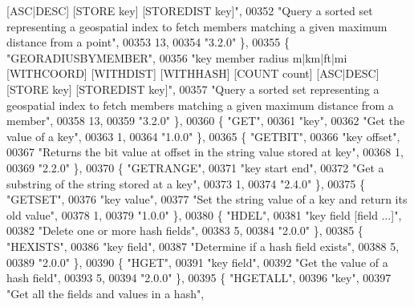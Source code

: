 \begin{DoxyCode}
{       [ASC|DESC] [STORE key] [STOREDIST key]"},
00352     \textcolor{stringliteral}{"Query a sorted set representing a geospatial index to fetch members matching a given maximum
       distance from a point"},
00353     13,
00354     \textcolor{stringliteral}{"3.2.0"} \},
00355     \{ \textcolor{stringliteral}{"GEORADIUSBYMEMBER"},
00356     \textcolor{stringliteral}{"key member radius m|km|ft|mi [WITHCOORD] [WITHDIST] [WITHHASH] [COUNT count] [ASC|DESC] [STORE
       key] [STOREDIST key]"},
00357     \textcolor{stringliteral}{"Query a sorted set representing a geospatial index to fetch members matching a given maximum
       distance from a member"},
00358     13,
00359     \textcolor{stringliteral}{"3.2.0"} \},
00360     \{ \textcolor{stringliteral}{"GET"},
00361     \textcolor{stringliteral}{"key"},
00362     \textcolor{stringliteral}{"Get the value of a key"},
00363     1,
00364     \textcolor{stringliteral}{"1.0.0"} \},
00365     \{ \textcolor{stringliteral}{"GETBIT"},
00366     \textcolor{stringliteral}{"key offset"},
00367     \textcolor{stringliteral}{"Returns the bit value at offset in the string value stored at key"},
00368     1,
00369     \textcolor{stringliteral}{"2.2.0"} \},
00370     \{ \textcolor{stringliteral}{"GETRANGE"},
00371     \textcolor{stringliteral}{"key start end"},
00372     \textcolor{stringliteral}{"Get a substring of the string stored at a key"},
00373     1,
00374     \textcolor{stringliteral}{"2.4.0"} \},
00375     \{ \textcolor{stringliteral}{"GETSET"},
00376     \textcolor{stringliteral}{"key value"},
00377     \textcolor{stringliteral}{"Set the string value of a key and return its old value"},
00378     1,
00379     \textcolor{stringliteral}{"1.0.0"} \},
00380     \{ \textcolor{stringliteral}{"HDEL"},
00381     \textcolor{stringliteral}{"key field [field ...]"},
00382     \textcolor{stringliteral}{"Delete one or more hash fields"},
00383     5,
00384     \textcolor{stringliteral}{"2.0.0"} \},
00385     \{ \textcolor{stringliteral}{"HEXISTS"},
00386     \textcolor{stringliteral}{"key field"},
00387     \textcolor{stringliteral}{"Determine if a hash field exists"},
00388     5,
00389     \textcolor{stringliteral}{"2.0.0"} \},
00390     \{ \textcolor{stringliteral}{"HGET"},
00391     \textcolor{stringliteral}{"key field"},
00392     \textcolor{stringliteral}{"Get the value of a hash field"},
00393     5,
00394     \textcolor{stringliteral}{"2.0.0"} \},
00395     \{ \textcolor{stringliteral}{"HGETALL"},
00396     \textcolor{stringliteral}{"key"},
00397     \textcolor{stringliteral}{"Get all the fields and values in a hash"},

\end{DoxyCode}
